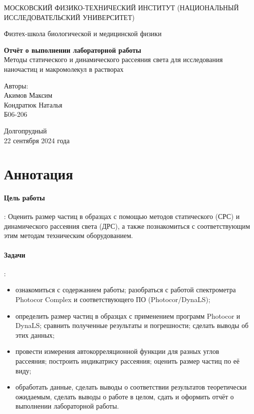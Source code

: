 \documentclass{article}
\begin{document}
\begin{titlepage}
	\begin{center}
		{\large МОСКОВСКИЙ ФИЗИКО-ТЕХНИЧЕСКИЙ ИНСТИТУТ (НАЦИОНАЛЬНЫЙ ИССЛЕДОВАТЕЛЬСКИЙ УНИВЕРСИТЕТ)}
	\end{center}
	\begin{center}
		{\large Физтех-школа биологической и медицинской физики}
	\end{center}
	
	
	\vspace{4.5cm}
	{\huge
		\begin{center}
			{\bf Отчёт о выполнении лабораторной работы}\\
			Методы статического и динамического рассеяния света для исследования наночастиц и макромолекул в растворах
		\end{center}
	}
	\vspace{3cm}
	\begin{flushright}
		{\LARGE Авторы:\\ Акимов Максим \\ Кондратюк Наталья \\
			\vspace{0.5cm}
			Б06-206}
	\end{flushright}
	\vspace{3cm}
	\begin{center}
		Долгопрудный 
       \\22 сентября 2024 года
	\end{center}
 
\end{titlepage}

\newpage 
\section{Аннотация}

\paragraph*{Цель работы}:
Оценить размер частиц в образцах с помощью методов статического (СРС) и динамического рассеяния света (ДРС), а также познакомиться с соответствующим этим методам техническим оборудованием.
\paragraph*{Задачи}:
\begin{itemize}
        \item ознакомиться с содержанием работы; разобраться с работой спектрометра Photocor Complex и соответствующего ПО (Photocor/DynaLS);
        \item определить размер частиц в образцах с применением программ Photocor и DynaLS; сравнить полученные результаты и погрешности; сделать выводы об этих данных;
        \item провести измерения автокорреляционной функции для разных углов рассеяния; построить индикатрису рассеяния; оценить размер частиц по её виду;
        \item обработать данные, сделать выводы о соответствии результатов теоретически ожидаемым, сделать выводы о работе в целом, сдать и оформить отчёт о выполнении лабораторной работы.
\end{itemize}
\end{document}
